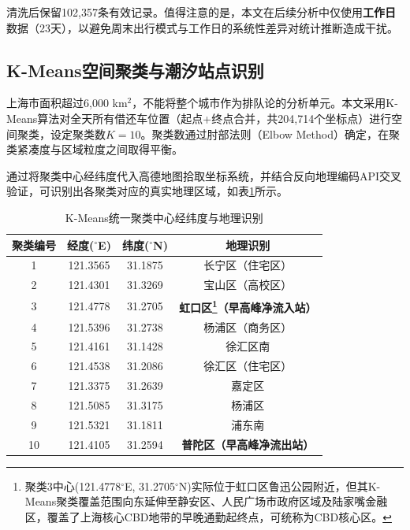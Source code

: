 \documentclass[12pt,a4paper]{article}
\begin{document}
清洗后保留102,357条有效记录。值得注意的是，本文在后续分析中仅使用\textbf{工作日}数据（23天），以避免周末出行模式与工作日的系统性差异对统计推断造成干扰。

\subsection{K-Means空间聚类与潮汐站点识别}

上海市面积超过6,000 km$^2$，不能将整个城市作为排队论的分析单元。本文采用K-Means算法对全天所有借还车位置（起点+终点合并，共204,714个坐标点）进行空间聚类，设定聚类数$K=10$。聚类数通过肘部法则（Elbow Method）确定，在聚类紧凑度与区域粒度之间取得平衡。

通过将聚类中心经纬度代入高德地图拾取坐标系统，并结合反向地理编码API交叉验证，可识别出各聚类对应的真实地理区域，如表\ref{tab:cluster_centers}所示。

\begin{table}[H]
\centering
\caption{K-Means统一聚类中心经纬度与地理识别}
\label{tab:cluster_centers}
\begin{minipage}{\textwidth}
\centering
\begin{tabular}{cccc}
\toprule
聚类编号 & 经度(${}^{\circ}$E) & 纬度(${}^{\circ}$N) & 地理识别 \\
\midrule
1 & 121.3565 & 31.1875 & 长宁区（住宅区） \\
2 & 121.4301 & 31.3269 & 宝山区（高校区） \\
3 & 121.4778 & 31.2705 & \textbf{虹口区\footnote{聚类3中心(121.4778$^{\circ}$E, 31.2705$^{\circ}$N)实际位于虹口区鲁迅公园附近，但其K-Means聚类覆盖范围向东延伸至静安区、人民广场市政府区域及陆家嘴金融区，覆盖了上海核心CBD地带的早晚通勤起终点，可统称为CBD核心区。}（早高峰净流入站）} \\
4 & 121.5396 & 31.2738 & 杨浦区（商务区） \\
5 & 121.4161 & 31.1428 & 徐汇区南 \\
6 & 121.4538 & 31.2086 & 徐汇区（住宅区） \\
7 & 121.3375 & 31.2639 & 嘉定区 \\
8 & 121.5085 & 31.3175 & 杨浦区 \\
9 & 121.5321 & 31.1811 & 浦东南 \\
10 & 121.4105 & 31.2594 & \textbf{普陀区（早高峰净流出站）} \\
\bottomrule
\end{tabular}
\end{minipage}
\end{table}
\end{document}
